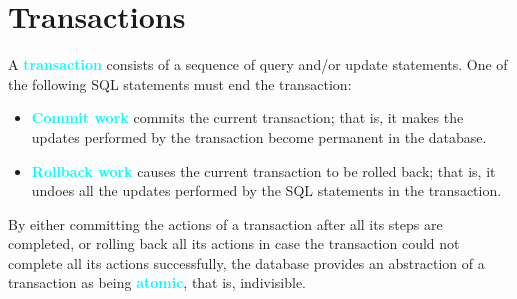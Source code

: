 \documentclass{Beautybook-EN}
\newcommand{\textcy}[1]{\textbf{\textcolor{cyan}{#1}}}
\begin{document}
\section{Transactions}

A \textcy{transaction} consists of a sequence of query and/or update statements. One of the following SQL statements must end the transaction:
\begin{itemize}
    \item \textcy{Commit work} commits the current transaction; that is, it makes the updates performed by the transaction become permanent in the database.
    \item \textcy{Rollback work} causes the current transaction to be rolled back; that is, it undoes all the updates performed by the SQL statements in the transaction.
\end{itemize}

By either committing the actions of a transaction after all its steps are completed, or rolling back all its actions in case the transaction could not complete all its actions successfully, the database provides an abstraction of a transaction as being \textcy{atomic}, that is, indivisible.

{ %
\normalem
\thispagestyle{empty}}
\makebottomcover
\end{document}
